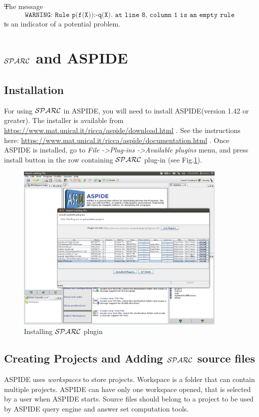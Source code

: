 \documentclass[12pt, letterpaper]{article}
\begin{document}
\st The message 
\begin{equation*}
\texttt{WARNING: Rule p(f(X)):-q(X). at line 8, column 1 is an empty rule} 
\end{equation*}
\st is an indicator of a potential problem.
\pagebreak
\section{${\cal SPARC}$ and ASPIDE}
\subsection{Installation}

For using ${\cal SPARC}$ in ASPIDE, you will need to install ASPIDE(version 1.42 or greater). 
The installer is available from {\scriptsize
\url{https://www.mat.unical.it/ricca/aspide/download.html}
}. See the instructions here:  {\scriptsize
\url{https://www.mat.unical.it/ricca/aspide/documentation.html}
}.  Once ASPIDE is installed, go to \textit{File -\textgreater Plug-ins -\textgreater Available plugins} menu, 
and press install button in the row containing ${\cal SPARC}$ plug-in (see Fig.\ref{fig:plug_install}).
\begin{figure}[ht]
\centering
\includegraphics[width=0.9\textwidth]{plugin.png}
\caption{Installing ${\cal SPARC}$ plugin}
\label{fig:plug_install}
\end{figure}


\pagebreak
\subsection{Creating Projects and Adding  ${\cal SPARC}$  source files}
ASPIDE uses \textit{workspaces} to store projects. Workspace is a folder that can contain multiple projects. ASPIDE can have only one workspace opened, that is selected by a user when ASPIDE starts. Source files should belong to a project to be used by  ASPIDE query engine and answer set computation tools. 
\end{document}
